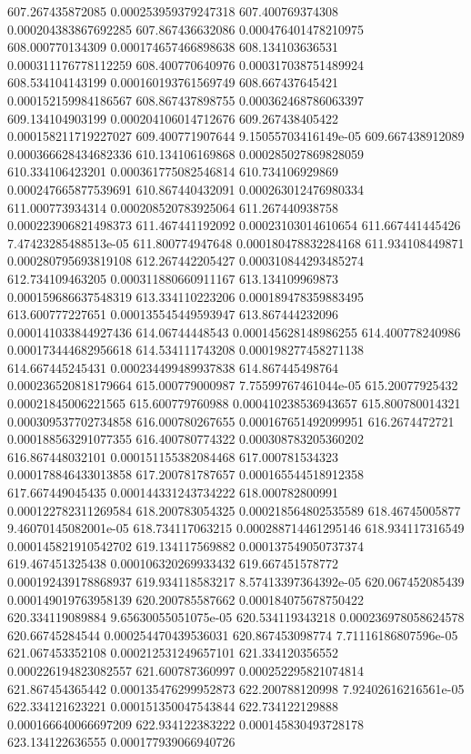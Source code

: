{607.267435872085 0.000253959379247318
607.400769374308 0.000204383867692285
607.867436632086 0.000476401478210975
608.000770134309 0.000174657466898638
608.134103636531 0.000311176778112259
608.400770640976 0.000317038751489924
608.534104143199 0.000160193761569749
608.667437645421 0.000152159984186567
608.867437898755 0.000362468786063397
609.134104903199 0.000204106014712676
609.267438405422 0.000158211719227027
609.400771907644 9.15055703416149e-05
609.667438912089 0.000366628434682336
610.134106169868 0.000285027869828059
610.334106423201 0.000361775082546814
610.734106929869 0.000247665877539691
610.867440432091 0.000263012476980334
611.000773934314 0.000208520783925064
611.267440938758 0.000223906821498373
611.467441192092 0.00023103014610654
611.667441445426 7.47423285488513e-05
611.800774947648 0.000180478832284168
611.934108449871 0.000280795693819108
612.267442205427 0.000310844293485274
612.734109463205 0.000311880660911167
613.134109969873 0.000159686637548319
613.334110223206 0.000189478359883495
613.600777227651 0.000135545449593947
613.867444232096 0.000141033844927436
614.06744448543 0.000145628148986255
614.400778240986 0.000173444682956618
614.534111743208 0.000198277458271138
614.667445245431 0.000234499489937838
614.867445498764 0.000236520818179664
615.000779000987 7.75599767461044e-05
615.20077925432 0.00021845006221565
615.600779760988 0.000410238536943657
615.800780014321 0.000309537702734858
616.000780267655 0.000167651492099951
616.2674472721 0.000188563291077355
616.400780774322 0.000308783205360202
616.867448032101 0.000151155382084468
617.000781534323 0.000178846433013858
617.200781787657 0.000165544518912358
617.667449045435 0.000144331243734222
618.000782800991 0.000122782311269584
618.200783054325 0.000218564802535589
618.46745005877 9.46070145082001e-05
618.734117063215 0.000288714461295146
618.934117316549 0.000145821910542702
619.134117569882 0.000137549050737374
619.467451325438 0.000106320269933432
619.667451578772 0.000192439178868937
619.934118583217 8.57413397364392e-05
620.067452085439 0.000149019763958139
620.200785587662 0.000184075678750422
620.334119089884 9.65630055051075e-05
620.534119343218 0.000236978058624578
620.66745284544 0.000254470439536031
620.867453098774 7.71116186807596e-05
621.067453352108 0.000212531249657101
621.334120356552 0.000226194823082557
621.600787360997 0.000252295821074814
621.867454365442 0.000135476299952873
622.200788120998 7.92402616216561e-05
622.334121623221 0.000151350047543844
622.734122129888 0.000166640066697209
622.934122383222 0.000145830493728178
623.134122636555 0.000177939066940726
}
